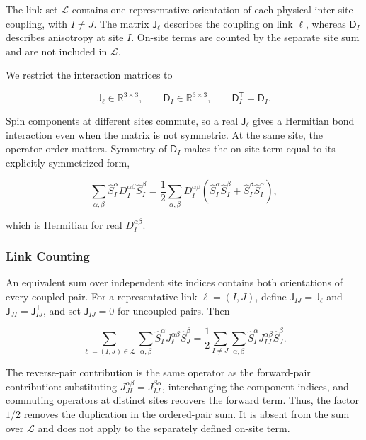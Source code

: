The link set \(\mathcal L\) contains one representative orientation of each physical inter-site coupling, with \(I\ne J\). The matrix \(\mathsf J_\ell\) describes the coupling on link \(\ell\), whereas \(\mathsf D_I\) describes anisotropy at site \(I\). On-site terms are counted by the separate site sum and are not included in \(\mathcal L\).

We restrict the interaction matrices to

\[
\mathsf J_\ell\in\mathbb R^{3\times3},
\qquad
\mathsf D_I\in\mathbb R^{3\times3},
\qquad
\mathsf D_I^{\mathsf T}=\mathsf D_I.
\]

Spin components at different sites commute, so a real \(\mathsf J_\ell\) gives a Hermitian bond interaction even when the matrix is not symmetric. At the same site, the operator order matters. Symmetry of \(\mathsf D_I\) makes the on-site term equal to its explicitly symmetrized form,

\[
\sum_{\alpha,\beta}
\hat S_I^\alpha D_I^{\alpha\beta}\hat S_I^\beta
=\frac12\sum_{\alpha,\beta}D_I^{\alpha\beta}
\left(\hat S_I^\alpha\hat S_I^\beta+\hat S_I^\beta\hat S_I^\alpha\right),
\]

which is Hermitian for real \(D_I^{\alpha\beta}\).

\subsubsection{Link Counting}

An equivalent sum over independent site indices contains both orientations of every coupled pair. For a representative link \(\ell=(I,J)\), define \(\mathsf J_{IJ}=\mathsf J_\ell\) and \(\mathsf J_{JI}=\mathsf J_{IJ}^{\mathsf T}\), and set \(\mathsf J_{IJ}=0\) for uncoupled pairs. Then

\begin{equation}\label{eq-lswt-link-sum-equivalence}
\sum_{\ell=(I,J)\in\mathcal{L}}
\sum_{\alpha,\beta}
\hat{S}^{\alpha}_{I}J_{\ell}^{\alpha\beta}\hat{S}^{\beta}_{J}
=
\frac{1}{2}
\sum_{I\ne J}
\sum_{\alpha,\beta}
\hat{S}^{\alpha}_{I}J_{IJ}^{\alpha\beta}\hat{S}^{\beta}_{J}.
\end{equation}

The reverse-pair contribution is the same operator as the forward-pair contribution: substituting \(J_{JI}^{\alpha\beta}=J_{IJ}^{\beta\alpha}\), interchanging the component indices, and commuting operators at distinct sites recovers the forward term. Thus, the factor \(1/2\) removes the duplication in the ordered-pair sum. It is absent from the sum over \(\mathcal L\) and does not apply to the separately defined on-site term.

